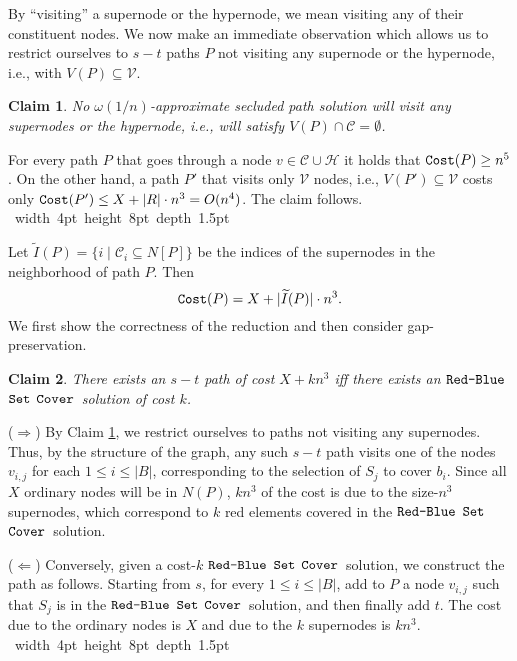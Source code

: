 \documentclass[12pt]{article}
\newtheorem{claim}{Claim}[section]
\def\Cost{\mbox{\tt Cost}}
\def\Proof{\par\noindent{\bf Proof:~}}
\def\blackslug{\hbox{\hskip 1pt \vrule width 4pt height 8pt
    depth 1.5pt \hskip 1pt}}
\def\QED{\quad\blackslug\lower 8.5pt\null\par}
\newcommand{\SuperIndex}[0]{\widetilde{I}}
\newcommand{\RBSC}[0]{$\mbox{\tt Red-Blue}$ $\mbox{\tt Set}$ $\mbox{\tt Cover}$}
\def\Cost{\mbox{\tt Cost}}
\begin{document}
By ``visiting'' a supernode or the hypernode, we mean visiting any of their constituent nodes.
We now make an immediate observation which allows us to restrict ourselves to $s-t$ paths $P$ not visiting any supernode or the hypernode, i.e., with $V(P) \subseteq \mathcal{V}$.
\begin{claim}
\label{cl:approx_1_n}
No $\omega(1/n)$-approximate secluded path solution will visit any supernodes or the hypernode, i.e., will satisfy $V(P) \cap \mathcal{C}=\emptyset$.
\end{claim}
\Proof
For every path $P$ that goes through a node $v \in \mathcal{C} \cup \mathcal{H}$ it holds that $\Cost(P) \geq n^{5}$. On the other hand, a path $P'$ that visits only $\mathcal{V}$ nodes, i.e., $V(P') \subseteq \mathcal{V}$ costs only $\Cost(P') \leq X+|R|\cdot n^{3}=O(n^{4})$. The claim follows.
\QED

Let $\SuperIndex(P)= \{ i \mid \mathcal{C}_i \subseteq N[P]\}$ be the indices of the supernodes in the neighborhood of path $P$. Then
\begin{equation*}
\Cost(P)=X+|\SuperIndex(P)| \cdot n^{3}.
\end{equation*}
We first show the correctness of the reduction and then consider gap-preservation.
\begin{claim}
\label{cl:rbcs_pp}
There exists an $s-t$ path of cost $X+kn^3$ iff there exists an \RBSC\ solution of cost $k$.
\end{claim}
\Proof
($\Rightarrow$) By Claim \ref{cl:approx_1_n}, we restrict ourselves to paths not visiting any supernodes. Thus, by the structure of the graph, any such $s-t$ path visits one of the nodes $v_{i,j}$ for each $1 \le i \le |B|$, corresponding to the selection of $S_j$ to cover $b_i$. Since all $X$ ordinary nodes will be in $N(P)$, $kn^3$ of the cost is due to the size-$n^3$ supernodes, which correspond to $k$ red elements covered in the \RBSC\ solution.

($\Leftarrow$) Conversely, given a cost-$k$ \RBSC\ solution, we construct the path as follows. Starting from $s$, for every $1 \le i \le |B|$, add to $P$ a node $v_{i,j}$ such that $S_j$ is in the \RBSC\ solution, and then finally add $t$. The cost due to the ordinary nodes is $X$ and due to the $k$ supernodes is $kn^3$.
\QED
\end{document}
